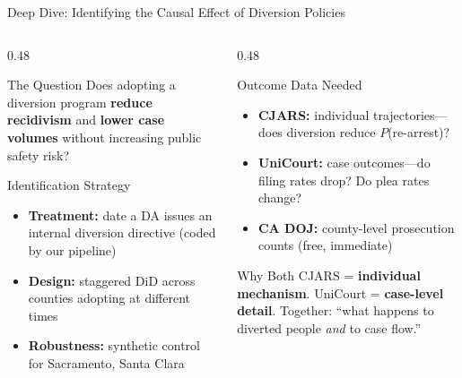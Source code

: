 \documentclass[aspectratio=169, 11pt]{beamer}
\begin{document}
\begin{frame}{Deep Dive: Identifying the Causal Effect of Diversion Policies}
\begin{columns}[T]
\begin{column}{0.48\textwidth}
\begin{block}{The Question}
{\small Does adopting a diversion program \textbf{reduce recidivism} and \textbf{lower case volumes} without increasing public safety risk?}
\end{block}
\vspace{3pt}
\begin{block}{Identification Strategy}
{\small
\begin{itemize}\setlength\itemsep{2pt}
    \item \textbf{Treatment:} date a DA issues an internal diversion directive (coded by our pipeline)
    \item \textbf{Design:} staggered DiD across counties adopting at different times
    \item \textbf{Robustness:} synthetic control for Sacramento, Santa Clara
\end{itemize}}
\end{block}
\end{column}
\begin{column}{0.48\textwidth}
\begin{block}{Outcome Data Needed}
{\small
\begin{itemize}\setlength\itemsep{2pt}
    \item \textbf{CJARS:} individual trajectories---does diversion reduce $P$(re-arrest)?
    \item \textbf{UniCourt:} case outcomes---do filing rates drop? Do plea rates change?
    \item \textbf{CA DOJ:} county-level prosecution counts (free, immediate)
\end{itemize}}
\end{block}
\vspace{3pt}
\begin{exampleblock}{Why Both}
{\small CJARS = \textbf{individual mechanism}. UniCourt = \textbf{case-level detail}. Together: ``what happens to diverted people \emph{and} to case flow.''}
\end{exampleblock}
\end{column}
\end{columns}
\end{frame}
\end{document}
